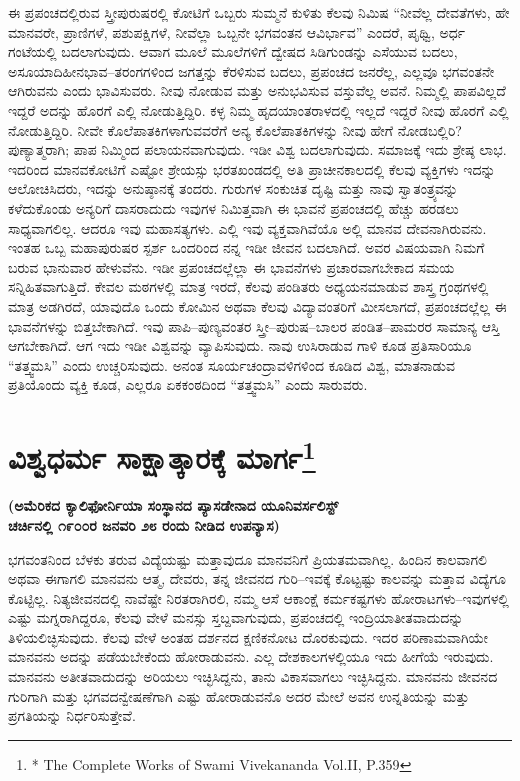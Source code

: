 ಈ ಪ್ರಪಂಚದಲ್ಲಿರುವ ಸ್ತ್ರೀಪುರುಷರಲ್ಲಿ ಕೋಟಿಗೆ ಒಬ್ಬರು ಸುಮ್ಮನೆ ಕುಳಿತು ಕೆಲವು ನಿಮಿಷ “ನೀವೆಲ್ಲ ದೇವತೆಗಳು, ಹೇ ಮಾನವರೇ, ಪ್ರಾಣಿಗಳೆ, ಪಶುಪಕ್ಷಿಗಳೆ, ನೀವೆಲ್ಲಾ ಒಬ್ಬನೇ ಭಗವಂತನ ಆವಿರ್ಭಾವ” ಎಂದರೆ, ಪೃಥ್ವಿ, ಅರ್ಧ ಗಂಟೆಯಲ್ಲಿ ಬದಲಾಗುವುದು. ಆವಾಗ ಮೂಲೆ ಮೂಲೆಗಳಿಗೆ ದ್ವೇಷದ ಸಿಡಿಗುಂಡನ್ನು ಎಸೆಯುವ ಬದಲು, ಅಸೂಯಾದಿಹೀನಭಾವ–ತರಂಗಗಳಿಂದ ಜಗತ್ತನ್ನು ಕೆರಳಿಸುವ ಬದಲು, ಪ್ರಪಂಚದ ಜನರೆಲ್ಲ, ಎಲ್ಲವೂ ಭಗವಂತನೇ ಆಗಿರುವನು ಎಂದು ಭಾವಿಸುವರು. ನೀವು ನೋಡುವ ಮತ್ತು ಅನುಭವಿಸುವ ವಸ್ತುವೆಲ್ಲ ಅವನೆ. ನಿಮ್ಮಲ್ಲಿ ಪಾಪವಿಲ್ಲದೆ ಇದ್ದರೆ ಅದನ್ನು ಹೊರಗೆ ಎಲ್ಲಿ ನೋಡುತ್ತಿದ್ದಿರಿ. ಕಳ್ಳ ನಿಮ್ಮ ಹೃದಯಾಂತರಾಳದಲ್ಲಿ ಇಲ್ಲದೆ ಇದ್ದರೆ ನೀವು ಹೊರಗೆ ಎಲ್ಲಿ ನೋಡುತ್ತಿದ್ದಿರಿ. ನೀವೇ ಕೊಲೆಪಾತಕಿಗಳಾಗುವವರೆಗೆ ಅನ್ಯ ಕೊಲೆಪಾತಕಿಗಳನ್ನು ನೀವು ಹೇಗೆ ನೋಡಬಲ್ಲಿರಿ? ಪುಣ್ಯಾತ್ಮರಾಗಿ; ಪಾಪ ನಿಮ್ಮಿಂದ ಪಲಾಯನವಾಗುವುದು. ಇಡೀ ವಿಶ್ವ ಬದಲಾಗುವುದು. ಸಮಾಜಕ್ಕೆ ಇದು ಶ್ರೇಷ್ಠ ಲಾಭ. ಇದರಿಂದ ಮಾನವಕೋಟಿಗೆ ಎಷ್ಟೋ ಶ್ರೇಯಸ್ಸು ಭರತಖಂಡದಲ್ಲಿ ಅತಿ ಪ್ರಾಚೀನಕಾಲದಲ್ಲಿ ಕೆಲವು ವ್ಯಕ್ತಿಗಳು ಇದನ್ನು ಆಲೋಚಿಸಿದರು, ಇದನ್ನು ಅನುಷ್ಠಾನಕ್ಕೆ ತಂದರು. ಗುರುಗಳ ಸಂಕುಚಿತ ದೃಷ್ಟಿ ಮತ್ತು ನಾವು ಸ್ವಾತಂತ್ರ್ಯವನ್ನು ಕಳೆದುಕೊಂಡು ಅನ್ಯರಿಗೆ ದಾಸರಾದುದು ಇವುಗಳ ನಿಮಿತ್ತವಾಗಿ ಈ ಭಾವನೆ ಪ್ರಪಂಚದಲ್ಲಿ ಹೆಚ್ಚು ಹರಡಲು ಸಾಧ್ಯವಾಗಲಿಲ್ಲ. ಆದರೂ ಇವು ಮಹಾಸತ್ಯಗಳು. ಎಲ್ಲಿ ಇವು ವ್ಯಕ್ತವಾಗಿವೆಯೊ ಅಲ್ಲಿ ಮಾನವ ದೇವನಾಗಿರುವನು. ಇಂತಹ ಒಬ್ಬ ಮಹಾಪುರುಷರ ಸ್ಪರ್ಶ ಒಂದರಿಂದ ನನ್ನ ಇಡೀ ಜೀವನ ಬದಲಾಗಿದೆ. ಅವರ ವಿಷಯವಾಗಿ ನಿಮಗೆ ಬರುವ ಭಾನುವಾರ ಹೇಳುವೆನು. ಇಡೀ ಪ್ರಪಂಚದಲ್ಲೆಲ್ಲಾ ಈ ಭಾವನೆಗಳು ಪ್ರಚಾರವಾಗಬೇಕಾದ ಸಮಯ ಸನ್ನಿಹಿತವಾಗುತ್ತಿದೆ. ಕೇವಲ ಮಠಗಳಲ್ಲಿ ಮಾತ್ರ ಇರದೆ, ಕೆಲವು ಪಂಡಿತರು ಅಧ್ಯಯನಮಾಡುವ ಶಾಸ್ತ್ರ ಗ್ರಂಥಗಳಲ್ಲಿ ಮಾತ್ರ ಅಡಗಿರದೆ, ಯಾವುದೊ ಒಂದು ಕೋಮಿನ ಅಥವಾ ಕೆಲವು ವಿದ್ಯಾವಂತರಿಗೆ ಮೀಸಲಾಗದೆ, ಪ್ರಪಂಚದಲ್ಲೆಲ್ಲ ಈ ಭಾವನೆಗಳನ್ನು ಬಿತ್ತಬೇಕಾಗಿದೆ. ಇವು ಪಾಪಿ–ಪುಣ್ಯವಂತರ ಸ್ತ್ರೀ–ಪುರುಷ–ಬಾಲರ ಪಂಡಿತ–ಪಾಮರರ ಸಾಮಾನ್ಯ ಆಸ್ತಿ ಆಗಬೇಕಾಗಿದೆ. ಆಗ ಇದು ಇಡೀ ವಿಶ್ವವನ್ನು ವ್ಯಾಪಿಸುವುದು. ನಾವು ಉಸಿರಾಡುವ ಗಾಳಿ ಕೂಡ ಪ್ರತಿಸಾರಿಯೂ “ತತ್ತ್ವಮಸಿ” ಎಂದು ಉಚ್ಚರಿಸುವುದು. ಅನಂತ ಸೂರ್ಯಚಂದ್ರಾವಳಿಗಳಿಂದ ಕೂಡಿದ ವಿಶ್ವ, ಮಾತನಾಡುವ ಪ್ರತಿಯೊಂದು ವ್ಯಕ್ತಿ ಕೂಡ, ಎಲ್ಲರೂ ಏಕಕಂಠದಿಂದ “ತತ್ತ್ವಮಸಿ” ಎಂದು ಸಾರುವರು.

\chapter{ವಿಶ್ವಧರ್ಮ ಸಾಕ್ಷಾತ್ಕಾರಕ್ಕೆ ಮಾರ್ಗ\protect\footnote{* The Complete Works of Swami Vivekananda Vol.II, P.359}}

\begin{center}
\textbf{(ಅಮೆರಿಕದ ಕ್ಯಾಲಿಫೋರ್ನಿಯಾ ಸಂಸ್ಥಾನದ ಪ್ಯಾಸಡೇನಾದ ಯೂನಿವರ್ಸಲಿಸ್ಟ್​ \\ ಚರ್ಚಿನಲ್ಲಿ ೧೯೦೦ರ ಜನವರಿ ೨೮ ರಂದು ನೀಡಿದ ಉಪನ್ಯಾಸ)}
\end{center}

ಭಗವಂತನಿಂದ ಬೆಳಕು ತರುವ ವಿದ್ಯೆಯಷ್ಟು ಮತ್ತಾವುದೂ ಮಾನವನಿಗೆ ಪ್ರಿಯತಮವಾಗಿಲ್ಲ. ಹಿಂದಿನ ಕಾಲವಾಗಲಿ ಅಥವಾ ಈಗಾಗಲಿ ಮಾನವನು ಆತ್ಮ, ದೇವರು, ತನ್ನ ಜೀವನದ ಗುರಿ–ಇವಕ್ಕೆ ಕೊಟ್ಟಷ್ಟು ಕಾಲವನ್ನು ಮತ್ತಾವ ವಿದ್ಯೆಗೂ ಕೊಟ್ಟಿಲ್ಲ. ನಿತ್ಯಜೀವನದಲ್ಲಿ ನಾವೆಷ್ಟೇ ನಿರತರಾಗಿರಲಿ, ನಮ್ಮ ಆಸೆ ಆಕಾಂಕ್ಷೆ ಕರ್ಮಕಷ್ಟಗಳು ಹೋರಾಟಗಳು–ಇವುಗಳಲ್ಲಿ ಎಷ್ಟು ಮಗ್ನರಾಗಿದ್ದರೂ, ಕೆಲವು ವೇಳೆ ಮನಸ್ಸು ಸ್ತಬ್ದವಾಗುವುದು, ಪ್ರಪಂಚದಲ್ಲಿ ಇಂದ್ರಿಯಾತೀತವಾದುದನ್ನು ತಿಳಿಯಲಿಚ್ಛಿಸುವುದು. ಕೆಲವು ವೇಳೆ ಅಂತಹ ದರ್ಶನದ ಕ್ಷಣಿಕನೋಟ ದೊರಕುವುದು. ಇದರ ಪರಿಣಾಮವಾಗಿಯೇ ಮಾನವನು ಅದನ್ನು ಪಡೆಯಬೇಕೆಂದು ಹೋರಾಡುವನು. ಎಲ್ಲ ದೇಶಕಾಲಗಳಲ್ಲಿಯೂ ಇದು ಹೀಗೆಯೆ ಇರುವುದು. ಮಾನವನು ಅತೀತವಾದುದನ್ನು ಅರಿಯಲು ಇಚ್ಛಿಸಿದ್ದನು, ತಾನು ವಿಕಾಸ\break ವಾಗಲು ಇಚ್ಛಿಸಿದ್ದನು. ಮಾನವನು ಜೀವನದ ಗುರಿಗಾಗಿ ಮತ್ತು ಭಗವದನ್ವೇಷಣೆಗಾಗಿ ಎಷ್ಟು ಹೋರಾಡುವನೊ ಅದರ ಮೇಲೆ ಅವನ ಉನ್ನತಿಯನ್ನು ಮತ್ತು ಪ್ರಗತಿಯನ್ನು ನಿರ್ಧರಿಸುತ್ತೇವೆ.

